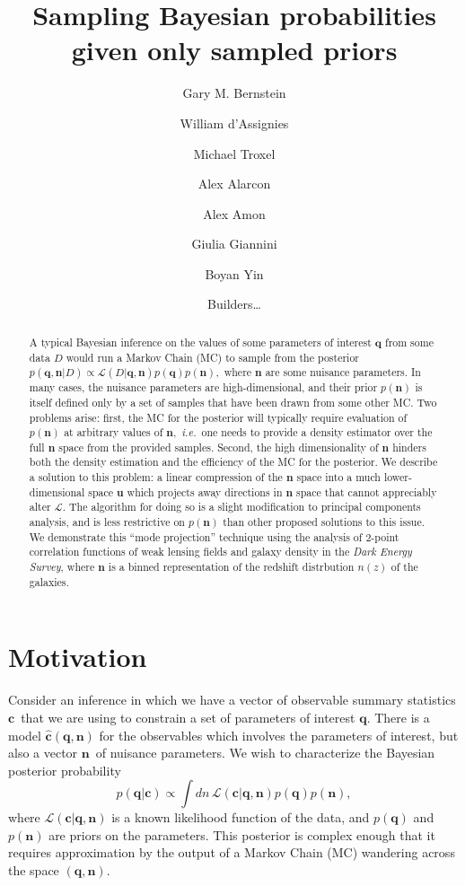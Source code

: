 \documentclass[linenumbers, onecolumn]{aastex63}
\newcommand{\ie}{\textit{i.e.}}
\newcommand{\vecc}{\ensuremath{\mathbf{c}}}
\newcommand{\vecq}{\ensuremath{\mathbf{q}}}
\newcommand{\vecn}{\ensuremath{\mathbf{n}}}
\newcommand{\vecu}{\ensuremath{\mathbf{u}}}
\newcommand{\hatc}{\ensuremath{\hat{\mathbf{c}}}}
\newcommand{\likeli}{\mathcal{L}}
\begin{document}
\title{Sampling Bayesian probabilities given only sampled priors}

\author[0000-0002-8613-8259]{Gary M. Bernstein}

\author{William d'Assignies}
\author{Michael Troxel}
\author{Alex Alarcon}
\author{Alex Amon}
\author{Giulia Giannini}
\author{Boyan Yin}
\author{Builders\ldots} %

\begin{abstract}
	\vspace{0.2in}
A typical Bayesian inference on the values of some parameters of
interest $\vecq$ from some data $D$ would run a Markov Chain (MC) to sample
from the posterior $p(\vecq,\vecn | D) \propto \likeli(D | \vecq,\vecn)
p(\vecq) p(\vecn),$ where $\vecn$ are some nuisance parameters.  In
many cases, the nuisance parameters are high-dimensional, and their
prior $p(\vecn)$ is itself defined only by a set of samples that have
been drawn from some other MC.  Two problems arise: first,
the MC for the posterior will typically require evaluation of
$p(\vecn)$ at arbitrary values of $\vecn,$ \ie\ one needs to provide a
density estimator over the full $\vecn$ space from the provided
samples.  Second, the high dimensionality of $\vecn$ hinders both the
density estimation and the efficiency of the MC for the posterior.  We
describe a solution to this problem: a linear compression of the
$\vecn$ space into a much lower-dimensional space $\vecu$ which
projects away directions in $\vecn$ space that cannot appreciably
alter $\likeli.$ The algorithm for doing so is a slight modification
to principal components analysis, and is less restrictive on
$p(\vecn)$ than other proposed solutions to this issue.
We demonstrate this ``mode projection'' technique using the analysis
of 2-point correlation functions of weak lensing fields and galaxy
density in the \textit{Dark Energy Survey}, where $\vecn$ is a binned representation of the redshift distrbution
$n(z)$ of the galaxies.
\end{abstract}
\reportnum{}

\section{Motivation} \label{sec:intro}

Consider an inference in which we have a vector of observable summary
statistics \vecc\ that we are using to constrain a set of parameters of
interest \vecq.  There is a model $\hatc(\vecq,\vecn)$ for the
observables which involves the parameters of interest, but also a
vector \vecn\ of nuisance parameters.  
We wish to characterize the Bayesian posterior probability
\begin{equation}
  p(\vecq | \vecc) \propto \int dn\, \likeli(\vecc | \vecq, \vecn) p(\vecq) p(\vecn),
\label{eq:posterior}
\end{equation}
where $\likeli(\vecc | \vecq, \vecn)$ is a known likelihood function
of the data, and $p(\vecq)$ and $p(\vecn)$ are priors on the
parameters.  This posterior is complex enough that it requires
approximation by the output of a Markov Chain (MC) wandering across the space $(\vecq,\vecn).$
\end{document}
